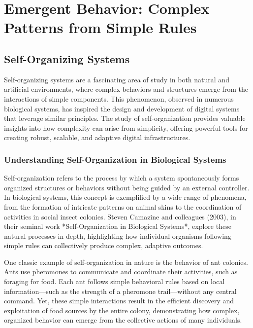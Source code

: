 \documentclass[12pt,twoside]{article}
\begin{document}
\section{Emergent Behavior: Complex Patterns from Simple Rules}

\subsection{Self-Organizing Systems}

Self-organizing systems are a fascinating area of study in both natural and artificial environments, where complex behaviors and structures emerge from the interactions of simple components. This phenomenon, observed in numerous biological systems, has inspired the design and development of digital systems that leverage similar principles. The study of self-organization provides valuable insights into how complexity can arise from simplicity, offering powerful tools for creating robust, scalable, and adaptive digital infrastructures.

\subsubsection{Understanding Self-Organization in Biological Systems}

Self-organization refers to the process by which a system spontaneously forms organized structures or behaviors without being guided by an external controller. In biological systems, this concept is exemplified by a wide range of phenomena, from the formation of intricate patterns on animal skins to the coordination of activities in social insect colonies. Steven Camazine and colleagues (2003), in their seminal work *Self-Organization in Biological Systems*, explore these natural processes in depth, highlighting how individual organisms following simple rules can collectively produce complex, adaptive outcomes.

One classic example of self-organization in nature is the behavior of ant colonies. Ants use pheromones to communicate and coordinate their activities, such as foraging for food. Each ant follows simple behavioral rules based on local information—such as the strength of a pheromone trail—without any central command. Yet, these simple interactions result in the efficient discovery and exploitation of food sources by the entire colony, demonstrating how complex, organized behavior can emerge from the collective actions of many individuals.
\end{document}
